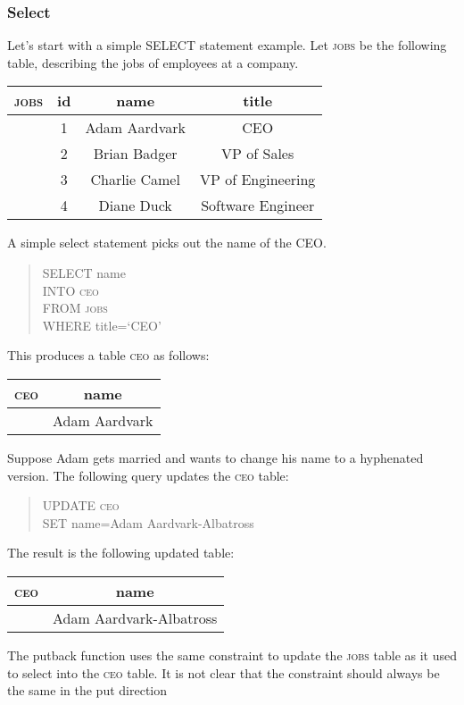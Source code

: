 \documentclass{article}
\begin{document}
\subsubsection*{Select}

Let's start with a simple SELECT statement example.
Let \textsc{jobs} be the following table, describing the jobs of employees
at a company.
\begin{center} \begin{tabular} {c | c c c}
    \textsc{jobs} & id & name & title \\
    \hline
    & 1 & Adam Aardvark & CEO \\
    & 2 & Brian Badger & VP of Sales \\
    & 3 & Charlie Camel & VP of Engineering \\
    & 4 & Diane Duck & Software Engineer
\end{tabular} \end{center}
A simple select statement picks out the name of the CEO.
\begin{quote}
    SELECT name \\
    INTO \textsc{ceo} \\
    FROM \textsc{jobs} \\
    WHERE title=`CEO'
\end{quote}
This produces a table \textsc{ceo} as follows:
\begin{center} \begin{tabular} {c | c}
    \textsc{ceo} & name\\
    \hline
    & Adam Aardvark
\end{tabular} \end{center}
Suppose Adam gets married and wants to change his name to a
hyphenated version. The following query updates the \textsc{ceo} table:
\begin{quote}
    UPDATE \textsc{ceo} \\
    SET name=Adam Aardvark-Albatross
\end{quote}
The result is the following updated table:
\begin{center} \begin{tabular} {c | c}
    \textsc{ceo} & name\\
    \hline
    & Adam Aardvark-Albatross
\end{tabular} \end{center}
The putback function uses the same constraint to update the \textsc{jobs}
table as it used to select into the \textsc{ceo} table. It
is not clear that the constraint should always be the same in the put direction
\end{document}
